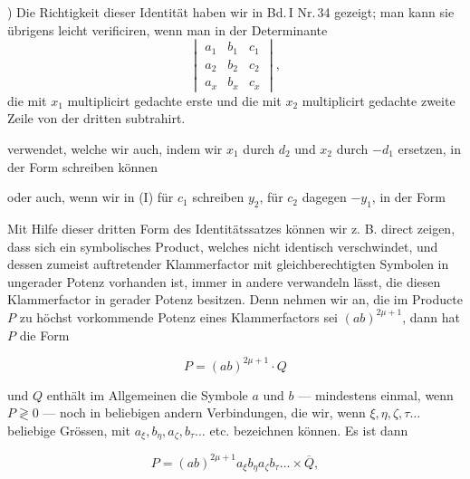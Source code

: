 \medskip
\noindent *) Die Richtigkeit dieser Identität haben wir in Bd.\,I
Nr.\,34 gezeigt; man kann sie übrigens leicht verificiren, wenn man in
der Determinante
\[
\begin{vmatrix} a_1 & b_1 & c_1 \\ a_2 & b_2 & c_2 \\ a_x & b_x & c_x \end{vmatrix} ,
\]
die mit $x_1$ multiplicirt gedachte erste und die mit $x_2$ multiplicirt gedachte zweite Zeile von der dritten subtrahirt.%


verwendet, welche wir auch, indem wir $x_1$ durch $d_2$ und $x_2$ durch
$-d_1$ ersetzen, in der Form schreiben können


oder auch, wenn wir in (I) %
für $c_1$ schreiben $y_2$, für $c_2$ dagegen $-y_1$,
in der Form


Mit Hilfe dieser dritten Form des Identitätssatzes können wir z. B.
direct zeigen, dass sich ein symbolisches Product, welches nicht identisch
verschwindet, und dessen zumeist auftretender Klammerfactor mit
gleichberechtigten Symbolen in ungerader Potenz vorhanden ist, immer
in andere verwandeln lässt, die diesen Klammerfactor in gerader Potenz
besitzen. Denn nehmen wir an, die im Producte $P$ zu höchst vorkommende
Potenz eines Klammerfactors sei $(ab)^{2\mu+1}$, dann hat $P$ die Form

\[ P = (ab)^{2\mu+1}\cdot Q \]

und $Q$ enthält im Allgemeinen die Symbole $a$ und $b$ --- mindestens
einmal, wenn $P\gtrless 0$ --- noch in beliebigen andern Verbindungen,
die wir, wenn $\xi, \eta, \zeta, \tau \ldots$ beliebige Grössen, mit
$a_\xi, b_\eta, a_\zeta, b_\tau \ldots$ etc. bezeichnen können. Es ist dann

\[ P = (ab)^{2\mu+1} a_\xi b_\eta a_\zeta b_\tau \ldots \times \overline{Q}, \]

